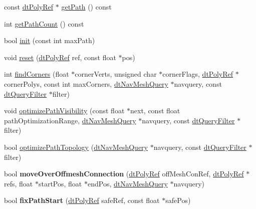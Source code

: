 \begin{DoxyCompactItemize}
\item 
const \hyperlink{group__detour_gab4e0b2257a670c1a800057999612b466}{dt\+Poly\+Ref} $\ast$ \hyperlink{classdtPathCorridor_adc4aee4a1867ce60e6b319edc686661f}{get\+Path} () const
\item 
int \hyperlink{classdtPathCorridor_a16bfdb275fb8f385c269cd06236f8213}{get\+Path\+Count} () const
\item 
bool \hyperlink{classdtPathCorridor_a85b4c98157b68a57b9c3302f45d0ed7f}{init} (const int max\+Path)
\item 
void \hyperlink{classdtPathCorridor_abe057e7b5e1d6677e3d9eadb558df2b0}{reset} (\hyperlink{group__detour_gab4e0b2257a670c1a800057999612b466}{dt\+Poly\+Ref} ref, const float $\ast$pos)
\item 
int \hyperlink{classdtPathCorridor_aa1076957ddf987a274a756fbf8202cab}{find\+Corners} (float $\ast$corner\+Verts, unsigned char $\ast$corner\+Flags, \hyperlink{group__detour_gab4e0b2257a670c1a800057999612b466}{dt\+Poly\+Ref} $\ast$corner\+Polys, const int max\+Corners, \hyperlink{classdtNavMeshQuery}{dt\+Nav\+Mesh\+Query} $\ast$navquery, const \hyperlink{classdtQueryFilter}{dt\+Query\+Filter} $\ast$filter)
\item 
void \hyperlink{classdtPathCorridor_a3970b6cd229731debe6beb41d9885463}{optimize\+Path\+Visibility} (const float $\ast$next, const float path\+Optimization\+Range, \hyperlink{classdtNavMeshQuery}{dt\+Nav\+Mesh\+Query} $\ast$navquery, const \hyperlink{classdtQueryFilter}{dt\+Query\+Filter} $\ast$filter)
\item 
bool \hyperlink{classdtPathCorridor_a69288d28ab5d23b2c2654e45c5a33c25}{optimize\+Path\+Topology} (\hyperlink{classdtNavMeshQuery}{dt\+Nav\+Mesh\+Query} $\ast$navquery, const \hyperlink{classdtQueryFilter}{dt\+Query\+Filter} $\ast$filter)
\item 
\mbox{\label{classdtPathCorridor_ae44344d2404b1d06f74c15f6748ad48d}} 
bool {\bfseries move\+Over\+Offmesh\+Connection} (\hyperlink{group__detour_gab4e0b2257a670c1a800057999612b466}{dt\+Poly\+Ref} off\+Mesh\+Con\+Ref, \hyperlink{group__detour_gab4e0b2257a670c1a800057999612b466}{dt\+Poly\+Ref} $\ast$refs, float $\ast$start\+Pos, float $\ast$end\+Pos, \hyperlink{classdtNavMeshQuery}{dt\+Nav\+Mesh\+Query} $\ast$navquery)
\item 
\mbox{\label{classdtPathCorridor_ae2e11d477d193c79197fa28acae824b8}} 
bool {\bfseries fix\+Path\+Start} (\hyperlink{group__detour_gab4e0b2257a670c1a800057999612b466}{dt\+Poly\+Ref} safe\+Ref, const float $\ast$safe\+Pos)

\end{DoxyCompactItemize}
